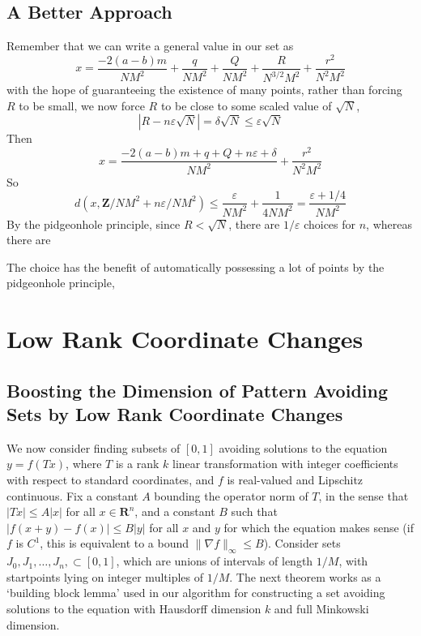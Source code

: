 \documentclass{report}
\theoremstyle{plain}
\theoremstyle{plain}
\begin{document}
\section{A Better Approach}

Remember that we can write a general value in our set as
%
\[ x = \frac{-2(a-b)m}{NM^2} + \frac{q}{NM^2} + \frac{Q}{NM^2} + \frac{R}{N^{3/2} M^2} + \frac{r^2}{N^2M^2} \]
%
with the hope of guaranteeing the existence of many points, rather than forcing $R$ to be small, we now force $R$ to be close to some scaled value of $\sqrt{N}$, 
%
\[ |R - n \varepsilon \sqrt{N}| = \delta \sqrt{N} \leq \varepsilon \sqrt{N} \]
%
Then
%
\[ x = \frac{-2(a-b)m + q + Q + n\varepsilon + \delta}{NM^2} + \frac{r^2}{N^2M^2} \]
%
So
%
\[ d \left( x, \mathbf{Z}/NM^2 + n\varepsilon / NM^2 \right) \leq \frac{\varepsilon}{NM^2} + \frac{1}{4NM^2} = \frac{\varepsilon + 1/4}{NM^2} \]
%
By the pidgeonhole principle, since $R < \sqrt{N}$, there are $1/\varepsilon$ choices for $n$, whereas there are


The choice has the benefit of automatically possessing a lot of points by the pidgeonhole principle,

\chapter{Low Rank Coordinate Changes}

\section{Boosting the Dimension of Pattern Avoiding Sets by Low Rank Coordinate Changes}

We now consider finding subsets of $[0,1]$ avoiding solutions to the equation $y = f(Tx)$, where $T$ is a rank $k$ linear transformation with integer coefficients with respect to standard coordinates, and $f$ is real-valued and Lipschitz continuous. Fix a constant $A$ bounding the operator norm of $T$, in the sense that $|Tx| \leq A|x|$ for all $x \in \mathbf{R}^n$, and a constant $B$ such that $|f(x+y) - f(x)| \leq B|y|$ for all $x$ and $y$ for which the equation makes sense (if $f$ is $C^1$, this is equivalent to a bound $\| \nabla f \|_\infty \leq B$). Consider sets $J_0, J_1, \dots, J_n, \subset [0,1]$, which are unions of intervals of length $1/M$, with startpoints lying on integer multiples of $1/M$. The next theorem works as a `building block lemma' used in our algorithm for constructing a set avoiding solutions to the equation with Hausdorff dimension $k$ and full Minkowski dimension.
\end{document}
